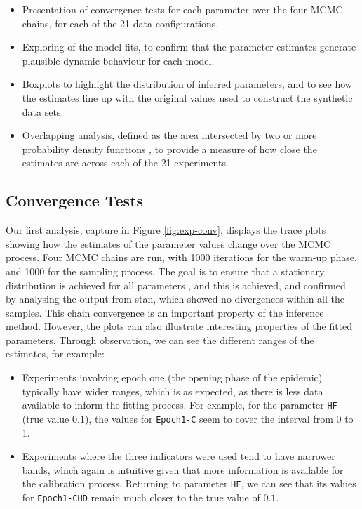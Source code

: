 \documentclass[10pt,letterpaper]{article}
\begin{document}
\begin{itemize}
\item
  Presentation of convergence tests for each parameter over the four MCMC chains, for each of the 21 data configurations.
\item
  Exploring of the model fits, to confirm that the parameter estimates generate plausible dynamic behaviour for each model.
\item
  Boxplots to highlight the distribution of inferred parameters, and to see how the estimates line up with the original values used to construct the synthetic data sets.
\item
  Overlapping analysis, defined as the area intersected by two or more probability density functions \citep{Pastore2018, 10.3389/fpsyg.2019.01089}, to provide a measure of how close the estimates are across each of the 21 experiments.
\end{itemize}

\hypertarget{convergence-tests}{%
\subsection{Convergence Tests}\label{convergence-tests}}

Our first analysis, capture in Figure \ref{fig:exp-conv}, displays the trace plots showing how the estimates of the parameter values change over the MCMC process. Four MCMC chains are run, with 1000 iterations for the warm-up phase, and 1000 for the sampling process. The goal is to ensure that a stationary distribution is achieved for all parameters \citep{https://doi.org/10.1002/sdr.1693}, and this is achieved, and confirmed by analysing the output from stan, which showed no divergences within all the samples. This chain convergence is an important property of the inference method. However, the plots can also illustrate interesting properties of the fitted parameters. Through observation, we can see the different ranges of the estimates, for example:

\begin{itemize}
\item
  Experiments involving epoch one (the opening phase of the epidemic) typically have wider ranges, which is as expected, as there is less data available to inform the fitting process. For example, for the parameter \texttt{HF} (true value \(0.1\)), the values for \texttt{Epoch1-C} seem to cover the interval from 0 to 1.
\item
  Experiments where the three indicators were used tend to have narrower bands, which again is intuitive given that more information is available for the calibration process. Returning to parameter \texttt{HF}, we can see that its values for \texttt{Epoch1-CHD} remain much closer to the true value of \(0.1\).
\end{itemize}
\end{document}
